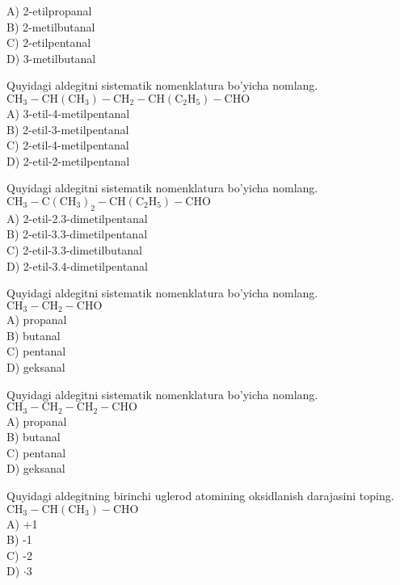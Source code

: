 A) 2-etilpropanal\\
B) 2-metilbutanal\\
C) 2-etilpentanal\\
D) 3-metilbutanal
  \item Quyidagi aldegitni sistematik nomenklatura bo'yicha nomlang.\\
$\mathrm{CH}_{3}-\mathrm{CH}\left(\mathrm{CH}_{3}\right)-\mathrm{CH}_{2}-\mathrm{CH}\left(\mathrm{C}_{2} \mathrm{H}_{5}\right)-\mathrm{CHO}$\\
A) 3-etil-4-metilpentanal\\
B) 2-etil-3-metilpentanal\\
C) 2-etil-4-metilpentanal\\
D) 2-etil-2-metilpentanal
  \item Quyidagi aldegitni sistematik nomenklatura bo'yicha nomlang.\\
$\mathrm{CH}_{3}-\mathrm{C}\left(\mathrm{CH}_{3}\right)_{2}-\mathrm{CH}\left(\mathrm{C}_{2} \mathrm{H}_{5}\right)-\mathrm{CHO}$\\
A) 2-etil-2.3-dimetilpentanal\\
B) 2-etil-3.3-dimetilpentanal\\
C) 2-etil-3.3-dimetilbutanal\\
D) 2-etil-3.4-dimetilpentanal
  \item Quyidagi aldegitni sistematik nomenklatura bo'yicha nomlang.\\
$\mathrm{CH}_{3}-\mathrm{CH}_{2}-\mathrm{CHO}$\\
A) propanal\\
B) butanal\\
C) pentanal\\
D) geksanal
  \item Quyidagi aldegitni sistematik nomenklatura bo'yicha nomlang.\\
$\mathrm{CH}_{3}-\mathrm{CH}_{2}-\mathrm{CH}_{2}-\mathrm{CHO}$\\
A) propanal\\
B) butanal\\
C) pentanal\\
D) geksanal
  \item Quyidagi aldegitning birinchi uglerod atomining oksidlanish darajasini toping.\\
$\mathrm{CH}_{3}-\mathrm{CH}\left(\mathrm{CH}_{3}\right)-\mathrm{CHO}$\\
A) +1\\
B) -1\\
C) -2\\
D) $\cdot 3$\\
